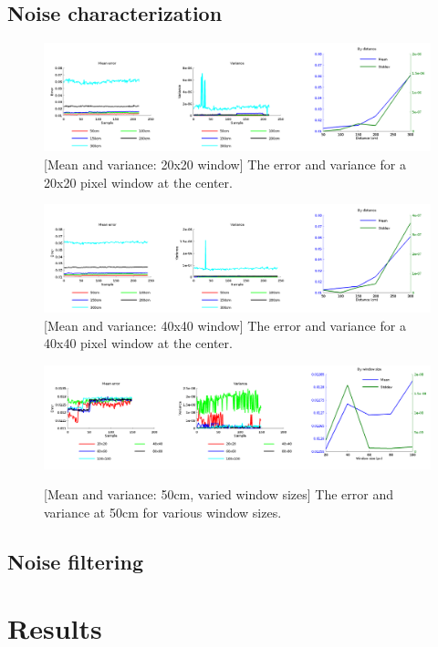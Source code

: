 \documentclass[11pt]{article}
\begin{document}
  \subsection{Noise characterization}
  \begin{figure}[ht]
    \centering
    \includegraphics[width=1\textwidth]{figures/20x20-plot.png}
    [Mean and variance: 20x20 window]{\label{fig:20x20} The error and variance for a 20x20 pixel window at the center.}
  \end{figure}
  \begin{figure}[ht]
    \centering
    \includegraphics[width=1\textwidth]{figures/plot40x40.png}
    [Mean and variance: 40x40 window]{\label{fig:40x40} The error and variance for a 40x40 pixel window at the center.}
  \end{figure}
  \begin{figure}[ht]
    \centering
    \includegraphics[width=1\textwidth]{figures/plotwindowsizes.png}
    
    [Mean and variance: 50cm, varied window sizes]{\label{fig:variedwindow} The error and variance at 50cm for various window sizes.}
  \end{figure}

\subsection{Noise filtering}

\section{Results}


\end{document}
